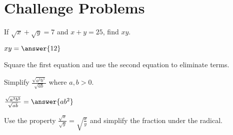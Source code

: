 \documentclass{ximera}
\begin{document}
\section{Challenge Problems}

\begin{problem}
If $\sqrt{x} + \sqrt{y} = 7$ and $x + y = 25$, find $xy$.

$xy = \answer{12}$

\begin{hint}
Square the first equation and use the second equation to eliminate terms.
\end{hint}
\end{problem}

\begin{problem}
Simplify $\frac{\sqrt{a^3b^5}}{\sqrt{ab}}$ where $a, b > 0$.

$\frac{\sqrt{a^3b^5}}{\sqrt{ab}} = \answer{ab^2}$

\begin{hint}
Use the property $\frac{\sqrt{x}}{\sqrt{y}} = \sqrt{\frac{x}{y}}$ and simplify the fraction under the radical.
\end{hint}
\end{problem}
\end{document}
